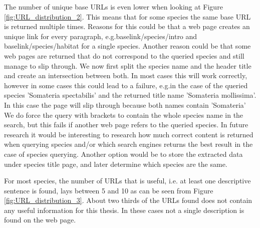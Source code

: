 \documentclass[a4paper, 12pt, oneside]{book} %
\begin{document}
The number of unique base URLs is even lower when looking at Figure \ref{fig:URL_distribution_2}.
This means that for some species the same base URL is returned multiple times. 
Reasons for this could be that a web page creates an unique link for every paragraph, e.g.baselink/species/intro and baselink/species/habitat for a single species.
Another reason could be that some web pages are returned that do not correspond to the queried species and still manage to slip through.
We now first split the species name and the header title and create an intersection between both.
In most cases this will work correctly, however in some cases this could lead to a failure, e.g.in the case of the queried species 'Somateria spectabilis' and the returned title name 'Somateria mollissima'.
In this case the page will slip through because both names contain 'Somateria'
We do force the query with brackets to contain the whole species name in the search, but this fails if another web page refers to the queried species.
In future research it would be interesting to research how much correct content is returned when querying species and/or which search engines returns the best result in the case of species querying.
Another option would be to store the extracted data under species title page, and later determine which species are the same.

For most species, the number of URLs that is useful, i.e. at least one descriptive sentence is found, lays between 5 and 10 as can be seen from Figure \ref{fig:URL_distribution_3}.
About two thirds of the URLs found does not contain any useful information for this thesis.
In these cases not a single description is found on the web page.


\end{document}
